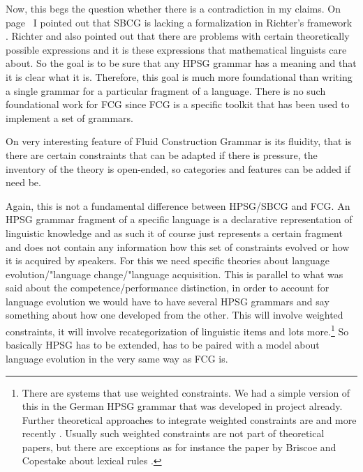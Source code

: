 \largerpage
\enlargethispage{6pt}
Now, this begs the question whether there is a contradiction in my claims. On
page~\pageref{page-sbcg-formalization} I pointed out that SBCG is lacking a formalization in
Richter's framework \citep{Richter2004a-u}. Richter and also \citet{LM2006a} pointed out that there are problems with
certain theoretically possible expressions and it is these expressions that mathematical linguists care
about. So the goal is to be sure that any HPSG grammar has a meaning and that it is clear what it
is. Therefore, this goal is much more foundational than writing a single grammar for a particular fragment
of a language. There is no such foundational work for FCG since FCG is a specific toolkit that has been used
to implement a set of grammars.


On very interesting feature of Fluid Construction Grammar is its fluidity, that is there are certain
constraints that can be adapted if there is pressure, the inventory of the theory is open-ended, so
categories and features can be added if need be.

Again, this is not a fundamental difference between HPSG/SBCG and FCG. An HPSG grammar fragment of a
specific language is a declarative representation of linguistic knowledge and as such it of course
just represents a certain fragment and does not contain any information how this set of constraints
evolved or how it is acquired by speakers. For this we need specific theories about language
evolution/"language change/"language acquisition. This is parallel to what was said about the
competence/performance distinction, in order to account for language evolution we would have to have
several HPSG grammars and say something about how one developed from the other. This will involve
weighted constraints, it will involve recategorization of linguistic items and lots more.\footnote{%
  There are systems that use weighted constraints. We had a simple version of this in the
  German HPSG grammar that was developed in \verbmobil project \citep{MK2000a} already. Further
  theoretical approaches to integrate weighted constraints are  and more recently
  . Usually such weighted constraints are not part of theoretical papers,
  but there are exceptions as for instance the paper by Briscoe and Copestake about lexical rules \citep{BC99a}.
} So basically HPSG has to be extended, has to be paired with a model about
language evolution in the very same way as FCG is.



